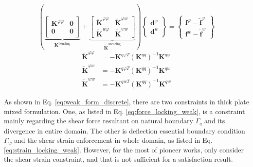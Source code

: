 \begin{equation}
\left(
\underbrace{
\begin{bmatrix}
\boldsymbol K^{\varphi \varphi} & \boldsymbol 0 \\
\boldsymbol 0 & \boldsymbol 0
\end{bmatrix}}_{\boldsymbol K^{\mathrm{bending}}}
+
\underbrace{
\begin{bmatrix}
\tilde{\boldsymbol K}^{\varphi \varphi} & \tilde{\boldsymbol K}^{\varphi w} \\
\tilde{\boldsymbol K}^{w \varphi} & \tilde{\boldsymbol K}^{ww}
\end{bmatrix}}_{\tilde{\boldsymbol K}^{\mathrm{shearing}}}
\right)
\begin{Bmatrix}
\boldsymbol d^\varphi \\ \boldsymbol d^w
\end{Bmatrix} =
\begin{Bmatrix}
\boldsymbol f^\varphi - \tilde{\boldsymbol f}^\varphi \\
\boldsymbol f^w - \tilde{\boldsymbol f}^w 
\end{Bmatrix}
\end{equation}
\begin{align}
\tilde{\boldsymbol K}^{\varphi \varphi}&=-\boldsymbol K^{q\varphi T}(\boldsymbol K^{qq})^{-1}\boldsymbol K^{q\varphi} \\
\tilde{\boldsymbol K}^{\varphi w}&=-\boldsymbol K^{q\varphi T}(\boldsymbol K^{qq})^{-1}\boldsymbol K^{qw} \\
\tilde{\boldsymbol K}^{ww}&=-\boldsymbol K^{qw T}(\boldsymbol K^{qq})^{-1}\boldsymbol K^{qw}
\end{align}
\begin{rmk}
    As shown in Eq. \eqref{eq:weak_form_discrete}, there are two constraints in thick plate mixed formulation. One, as listed in Eq. \eqref{eq:force_locking_weak}, is a constraint mainly regarding the shear force resultant on natural boundary $\Gamma_q$ and its divergence in entire domain.
    The other is deflection essential boundary condition $\Gamma_w$ and the shear strain enforcement in whole domain, as listed in Eq. \eqref{eq:strain_locking_weak}.
    However, for the most of pioneer works, only consider the shear strain constraint, and that is not sufficient for a satisfaction result.
\end{rmk}

\begin{rmk}

\end{rmk}
